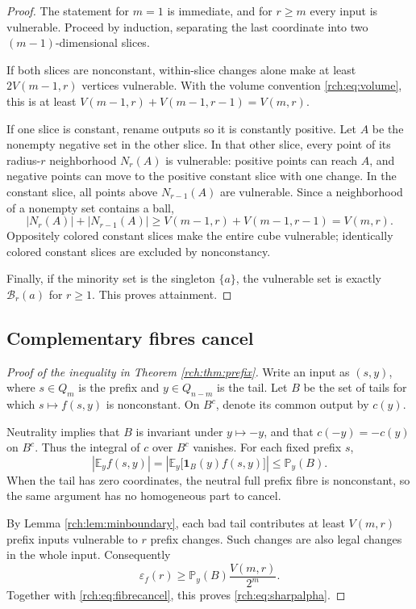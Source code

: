 \documentclass[11pt]{article}
\theoremstyle{definition}
\theoremstyle{remark}
\newcommand{\E}{\mathbb E}
\newcommand{\Prb}{\mathbb P}
\newcommand{\eps}{\varepsilon}
\newcommand{\one}{\mathbf 1}
\newcommand{\Ball}{\mathcal B}
\newcommand{\vol}{V}
\begin{document}
\begin{proof}
The statement for \(m=1\) is immediate, and for \(r\ge m\) every input is
vulnerable. Proceed by induction, separating the last coordinate into two
\((m-1)\)-dimensional slices.

If both slices are nonconstant, within-slice changes alone make at least
\(2\vol(m-1,r)\) vertices vulnerable. With the volume convention
\eqref{rch:eq:volume}, this is at least
\(\vol(m-1,r)+\vol(m-1,r-1)=\vol(m,r)\).

If one slice is constant, rename outputs so it is constantly positive. Let
\(A\) be the nonempty negative set in the other slice. In that other slice,
every point of its radius-\(r\) neighborhood \(N_r(A)\) is vulnerable:
positive points can reach \(A\), and negative points can move to the positive
constant slice with one change. In the constant slice, all points above
\(N_{r-1}(A)\) are vulnerable. Since a neighborhood of a nonempty set contains
a ball,
\[
 |N_r(A)|+|N_{r-1}(A)|\ge
 \vol(m-1,r)+\vol(m-1,r-1)=\vol(m,r).
\]
Oppositely colored constant slices make the entire cube vulnerable; identically
colored constant slices are excluded by nonconstancy.

Finally, if the minority set is the singleton \(\{a\}\), the vulnerable set
is exactly \(\Ball_r(a)\) for \(r\ge1\). This proves attainment.
\end{proof}

\subsection{Complementary fibres cancel}

\begin{proof}[Proof of the inequality in Theorem \ref{rch:thm:prefix}]
Write an input as \((s,y)\), where \(s\in Q_m\) is the prefix and
\(y\in Q_{n-m}\) is the tail. Let \(B\) be the set of tails for which
\(s\mapsto f(s,y)\) is nonconstant. On \(B^c\), denote its common output by
\(c(y)\).

Neutrality implies that \(B\) is invariant under \(y\mapsto-y\), and that
\(c(-y)=-c(y)\) on \(B^c\). Thus the integral of \(c\) over \(B^c\)
vanishes. For each fixed prefix \(s\),
\begin{equation}
 \left|\E_y f(s,y)\right|
 =\left|\E_y\bigl[\one_B(y)f(s,y)\bigr]\right|
 \le\Prb_y(B).
 \label{rch:eq:fibrecancel}
\end{equation}
When the tail has zero coordinates, the neutral full prefix fibre is
nonconstant, so the same argument has no homogeneous part to cancel.

By Lemma \ref{rch:lem:minboundary}, each bad tail contributes at least
\(\vol(m,r)\) prefix inputs vulnerable to \(r\) prefix changes. Such changes
are also legal changes in the whole input. Consequently
\[
 \eps_f(r)\ge\Prb_y(B)\frac{\vol(m,r)}{2^m}.
\]
Together with \eqref{rch:eq:fibrecancel}, this proves \eqref{rch:eq:sharpalpha}.
\end{proof}
\end{document}
